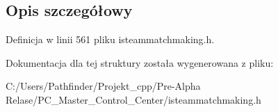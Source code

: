 \subsection{Opis szczegółowy}


Definicja w linii 561 pliku isteammatchmaking.\+h.



Dokumentacja dla tej struktury została wygenerowana z pliku\+:\begin{DoxyCompactItemize}
\item 
C\+:/\+Users/\+Pathfinder/\+Projekt\+\_\+cpp/\+Pre-\/\+Alpha Relase/\+P\+C\+\_\+\+Master\+\_\+\+Control\+\_\+\+Center/isteammatchmaking.\+h\end{DoxyCompactItemize}
